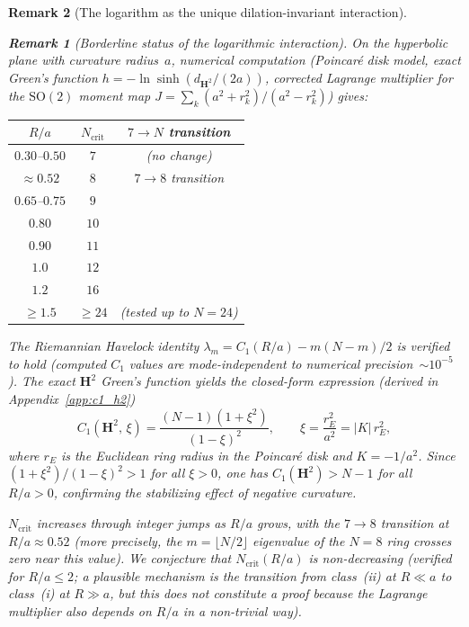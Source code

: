 \documentclass[12pt, a4paper]{article}
\newtheorem{remark}{Remark}[section]
\numberwithin{equation}{section}
\begin{document}
\begin{remark}[The logarithm as the unique dilation-invariant interaction]
\begin{remark}[Borderline status of the logarithmic interaction]
\noindent
On the hyperbolic plane with curvature radius~$a$, numerical
computation (Poincar\'e disk model, exact Green's function
$h = -\ln\sinh(d_{\mathbf{H}^2}/(2a))$, corrected Lagrange multiplier
for the $\mathrm{SO}(2)$ moment map $J = \sum_k (a^2{+}r_k^2)/(a^2{-}r_k^2)$)
gives:
\begin{center}
\begin{tabular}{ccc}
\toprule
$R/a$ & $N_{\mathrm{crit}}$ & $7\to N$ transition \\
\midrule
$0.30$--$0.50$ & $7$ & (no change) \\
$\approx 0.52$ & $8$ & $7\to 8$ transition \\
$0.65$--$0.75$ & $9$ & \\
$0.80$          & $10$ & \\
$0.90$          & $11$ & \\
$1.0$           & $12$ & \\
$1.2$           & $16$ & \\
$\ge 1.5$       & $\ge 24$ & (tested up to $N = 24$) \\
\bottomrule
\end{tabular}
\end{center}
The Riemannian Havelock identity $\lambda_m = C_1(R/a) - m(N{-}m)/2$
is verified to hold (computed $C_1$ values are mode-independent to
numerical precision~$\sim 10^{-5}$).  The exact $\mathbf{H}^2$
Green's function yields the closed-form expression (derived in
Appendix~\ref{app:c1_h2})
\begin{equation}
  C_1(\mathbf{H}^2,\,\xi)
    = \frac{(N-1)(1+\xi^2)}{(1-\xi)^2},
  \qquad \xi = \frac{r_E^2}{a^2} = |K|\,r_E^2 ,
  \label{eq:C1_H2}
\end{equation}
where $r_E$ is the Euclidean ring radius in the Poincar\'e disk and
$K = -1/a^2$.  Since $(1+\xi^2)/(1-\xi)^2 > 1$ for all $\xi > 0$,
one has $C_1(\mathbf{H}^2) > N{-}1$ for all $R/a > 0$, confirming the
stabilizing effect of negative curvature.

$N_{\mathrm{crit}}$ increases through integer jumps as $R/a$ grows,
with the $7 \to 8$ transition at $R/a \approx 0.52$ (more precisely,
the $m = \lfloor N/2\rfloor$ eigenvalue of the $N = 8$ ring crosses
zero near this value).
We \emph{conjecture} that $N_{\mathrm{crit}}(R/a)$ is non-decreasing
(verified for $R/a \le 2$; a plausible mechanism is the
transition from class~(ii) at $R \ll a$ to class~(i) at $R \gg a$,
but this does not constitute a proof because the Lagrange multiplier
also depends on $R/a$ in a non-trivial way).


\end{remark}
\end{remark}
\end{document}
